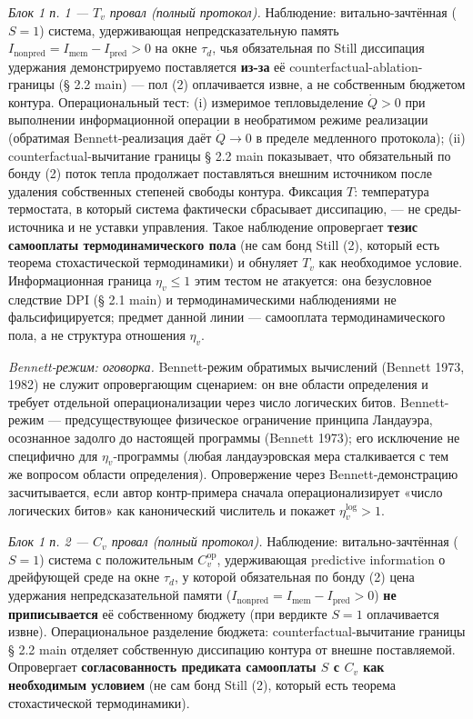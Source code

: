 \documentclass[pdflatex,sn-mathphys-ay]{sn-jnl}
\begin{document}
\emph{Блок 1 п. 1 --- \(T_v\) провал (полный протокол).} Наблюдение: витально-зачтённая (\(S = 1\)) система, удерживающая непредсказательную память \(I_{\text{nonpred}} = I_{\text{mem}} - I_{\text{pred}} > 0\) на окне \(\tau_d\), чья обязательная по Still диссипация удержания демонстрируемо поставляется \textbf{из-за} её counterfactual-ablation-границы (§ 2.2 main) --- пол (2) оплачивается извне, а не собственным бюджетом контура. Операциональный тест: (i) измеримое тепловыделение \(\dot Q > 0\) при выполнении информационной операции в необратимом режиме реализации (обратимая Bennett-реализация даёт \(\dot Q \to 0\) в пределе медленного протокола); (ii) counterfactual-вычитание границы § 2.2 main показывает, что обязательный по бонду (2) поток тепла продолжает поставляться внешним источником после удаления собственных степеней свободы контура. Фиксация \(T\): температура термостата, в который система фактически сбрасывает диссипацию, --- не среды-источника и не уставки управления. Такое наблюдение опровергает \textbf{тезис самооплаты термодинамического пола} (не сам бонд Still (2), который есть теорема стохастической термодинамики) и обнуляет \(T_v\) как необходимое условие. Информационная граница \(\eta_v \le 1\) этим тестом не атакуется: она безусловное следствие DPI (§ 2.1 main) и термодинамическими наблюдениями не фальсифицируется; предмет данной линии --- самооплата термодинамического пола, а не структура отношения \(\eta_v\).

\emph{Bennett-режим: оговорка.} Bennett-режим обратимых вычислений (Bennett 1973, 1982) не служит опровергающим сценарием: он вне области определения и требует отдельной операционализации через число логических битов. Bennett-режим --- предсуществующее физическое ограничение принципа Ландауэра, осознанное задолго до настоящей программы (Bennett 1973); его исключение не специфично для \(\eta_v\)-программы (любая ландауэровская мера сталкивается с тем же вопросом области определения). Опровержение через Bennett-демонстрацию засчитывается, если автор контр-примера сначала операционализирует «число логических битов» как канонический числитель и покажет \(\eta_v^{\text{log}} > 1\).

\emph{Блок 1 п. 2 --- \(C_v\) провал (полный протокол).} Наблюдение: витально-зачтённая (\(S = 1\)) система с положительным \(C_v^{\text{op}}\), удерживающая predictive information о дрейфующей среде на окне \(\tau_d\), у которой обязательная по бонду (2) цена удержания непредсказательной памяти (\(I_{\text{nonpred}} = I_{\text{mem}} - I_{\text{pred}} > 0\)) \textbf{не приписывается} её собственному бюджету (при вердикте \(S = 1\) оплачивается извне). Операциональное разделение бюджета: counterfactual-вычитание границы § 2.2 main отделяет собственную диссипацию контура от внешне поставляемой. Опровергает \textbf{согласованность предиката самооплаты \(S\) с \(C_v\) как необходимым условием} (не сам бонд Still (2), который есть теорема стохастической термодинамики).
\end{document}
